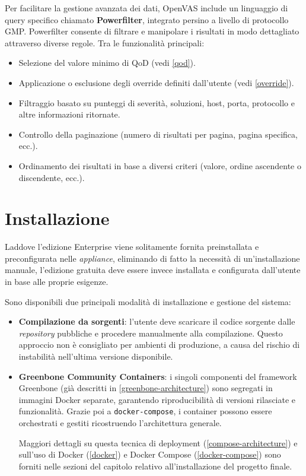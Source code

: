 Per facilitare la gestione avanzata dei dati, OpenVAS include un linguaggio di query specifico chiamato \textbf{Powerfilter}, integrato persino a livello di protocollo GMP. Powerfilter consente di filtrare e manipolare i risultati in modo dettagliato attraverso diverse regole. Tra le funzionalità principali:
\begin{itemize}
    \item Selezione del valore minimo di QoD (vedi \ref{qod}).
    \item Applicazione o esclusione degli override definiti dall'utente (vedi \ref{override}).
    \item Filtraggio basato su punteggi di severità, soluzioni, host, porta, protocollo e altre informazioni ritornate.
    \item Controllo della paginazione (numero di risultati per pagina, pagina specifica, ecc.).
    \item Ordinamento dei risultati in base a diversi criteri (valore, ordine ascendente o discendente, ecc.).
\end{itemize}

\section{Installazione}
Laddove l'edizione Enterprise viene solitamente fornita preinstallata e preconfigurata nelle \emph{appliance}, eliminando di fatto la necessità di un'installazione manuale, l'edizione gratuita deve essere invece installata e configurata dall'utente in base alle proprie esigenze.

Sono disponibili due principali modalità di installazione e gestione del sistema:

\begin{itemize}
    \item \textbf{Compilazione da sorgenti}: l'utente deve scaricare il codice sorgente dalle \emph{repository} pubbliche e procedere manualmente alla compilazione. Questo approccio non è consigliato per ambienti di produzione, a causa del rischio di instabilità nell'ultima versione disponibile.
    
    \item \textbf{Greenbone Community Containers}: i singoli componenti del framework Greenbone (già descritti in \ref{greenbone-architecture}) sono segregati in immagini Docker separate, garantendo riproducibilità di versioni rilasciate e funzionalità. Grazie poi a \texttt{docker-compose}, i container possono essere orchestrati e gestiti ricostruendo l'architettura generale.
    \label{greenbone-community-containers}

    Maggiori dettagli su questa tecnica di deployment (\ref{compose-architecture}) e sull'uso di Docker (\ref{docker}) e Docker Compose (\ref{docker-compose}) sono forniti nelle sezioni del capitolo relativo all'installazione del progetto finale.
\end{itemize}

